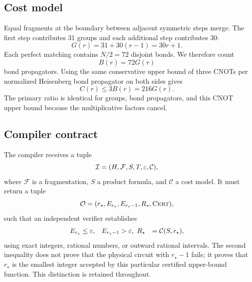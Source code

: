 \subsection{Cost model}

Equal fragments at the boundary between adjacent symmetric steps merge.  The
first step contributes 31 groups and each additional step contributes 30:
\begin{equation}
 G(r)=31+30(r-1)=30r+1.
 \label{eq:groups}
\end{equation}
Each perfect matching contains $N/2=72$ disjoint bonds.  We therefore count
\begin{equation}
 B(r)=72G(r)
 \label{eq:bonds}
\end{equation}
bond propagators.  Using the same conservative upper bound of three CNOTs per
normalized Heisenberg bond propagator on both sides gives
\begin{equation}
 C(r)\le 3B(r)=216G(r).
 \label{eq:cnots}
\end{equation}
The primary ratio is identical for groups, bond propagators, and this CNOT
upper bound because the multiplicative factors cancel.

\subsection{Compiler contract}

The compiler receives a tuple
\begin{equation}
 \mathcal I=(H,\mathcal F,S,T,\varepsilon,\mathcal C),
\end{equation}
where $\mathcal F$ is a fragmentation, $S$ a product formula, and
$\mathcal C$ a cost model.  It must return a tuple
\begin{equation}
 \mathcal O=(r_\star,E_{r_\star},E_{r_\star-1},R_\star,\textsc{Cert}),
\end{equation}
such that an independent verifier establishes
\begin{align}
 E_{r_\star}&\le\varepsilon,& E_{r_\star-1}&>\varepsilon,\label{eq:adjacent}\
 R_\star&=\mathcal C(S,r_\star),
\end{align}
using exact integers, rational numbers, or outward rational intervals.  The
second inequality does not prove that the physical circuit with
$r_\star-1$ fails; it proves that $r_\star$ is the smallest integer accepted
by this particular certified upper-bound function.  This distinction is
retained throughout.
